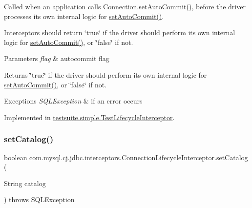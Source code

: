 Called when an application calls Connection.\+set\+Auto\+Commit(), before the driver processes its own internal logic for \mbox{\hyperlink{interfacecom_1_1mysql_1_1cj_1_1jdbc_1_1interceptors_1_1_connection_lifecycle_interceptor_a59c4f11d95ed73bad5c35c6741c03197}{set\+Auto\+Commit()}}.

Interceptors should return \char`\"{}true\char`\"{} if the driver should perform its own internal logic for \mbox{\hyperlink{interfacecom_1_1mysql_1_1cj_1_1jdbc_1_1interceptors_1_1_connection_lifecycle_interceptor_a59c4f11d95ed73bad5c35c6741c03197}{set\+Auto\+Commit()}}, or \char`\"{}false\char`\"{} if not.


\begin{DoxyParams}{Parameters}
{\em flag} & autocommit flag \\
\hline
\end{DoxyParams}
\begin{DoxyReturn}{Returns}
\char`\"{}true\char`\"{} if the driver should perform its own internal logic for \mbox{\hyperlink{interfacecom_1_1mysql_1_1cj_1_1jdbc_1_1interceptors_1_1_connection_lifecycle_interceptor_a59c4f11d95ed73bad5c35c6741c03197}{set\+Auto\+Commit()}}, or \char`\"{}false\char`\"{} if not.
\end{DoxyReturn}

\begin{DoxyExceptions}{Exceptions}
{\em S\+Q\+L\+Exception} & if an error occurs \\
\hline
\end{DoxyExceptions}


Implemented in \mbox{\hyperlink{classtestsuite_1_1simple_1_1_test_lifecycle_interceptor_a98376ea207527feed3bc76d491c98cc2}{testsuite.\+simple.\+Test\+Lifecycle\+Interceptor}}.

\mbox{\label{interfacecom_1_1mysql_1_1cj_1_1jdbc_1_1interceptors_1_1_connection_lifecycle_interceptor_af094892c143ea900543d639bfaf1b258}} 
\subsubsection{\texorpdfstring{set\+Catalog()}{setCatalog()}}
{\footnotesize\ttfamily boolean com.\+mysql.\+cj.\+jdbc.\+interceptors.\+Connection\+Lifecycle\+Interceptor.\+set\+Catalog (\begin{DoxyParamCaption}\item[{String}]{catalog }\end{DoxyParamCaption}) throws S\+Q\+L\+Exception}

